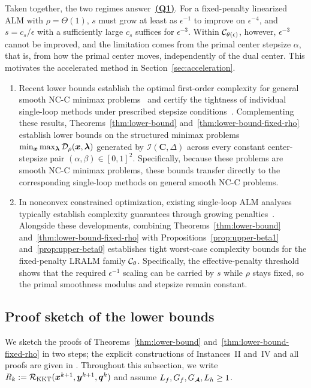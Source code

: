 Taken together, the two regimes answer~\hyperlink{Q1}{\textbf{(Q1)}}.
For a fixed-penalty linearized ALM with \(\rho=\Theta(1)\), \(s\) must grow at
least as \(\epsilon^{-1}\) to improve on \(\epsilon^{-4}\), and
\(s=c_s/\epsilon\) with a sufficiently large \(c_s\) suffices for
\(\epsilon^{-3}\). Within \(\mathcal{C}_{\theta(\epsilon)}\), however,
\(\epsilon^{-3}\) cannot be improved, and the limitation comes from the primal
center stepsize \(\alpha\), that is, from how the primal center moves,
independently of the dual center. This motivates 
the accelerated method in Section~\ref{sec:acceleration}.

\begin{remark} 
\begin{enumerate}[label=(\roman*)]
\item Recent lower bounds establish the optimal first-order complexity for
general smooth NC-C minimax problems~\cite{pan2026optimal,zhang2026matching}
and certify the tightness of individual single-loop methods under prescribed
stepsize
conditions~\cite[Theorem~3.4(i) and Corollary~3.1(i)]{li2026smoothing}.
Complementing these results, Theorems~\ref{thm:lower-bound}
and~\ref{thm:lower-bound-fixed-rho} establish lower bounds on the structured
minimax problems \(\min_{\bm{x}}\max_{\bm{\lambda}}\mathcal{D}_\rho(\bm{x},\bm{\lambda})\)
generated by \(\mathcal I(\mathbf C,\Delta)\) across every constant
center-stepsize pair \((\alpha,\beta)\in[0,1]^2\). Specifically, because
these problems are smooth NC-C minimax problems, these bounds transfer
directly to the corresponding single-loop methods on
general smooth NC-C problems.
\item In nonconvex constrained optimization, existing single-loop ALM analyses
typically establish complexity guarantees through growing
penalties~\cite{luSingleLoopGradientDescent2022,sun2024dual_descent_alm_admm,elbourkhissi2025perturbed}.
Alongside these developments, combining Theorems~\ref{thm:lower-bound}
and~\ref{thm:lower-bound-fixed-rho} with Propositions~\ref{prop:upper-beta1}
and~\ref{prop:upper-beta0} establishes tight worst-case complexity bounds for
the fixed-penalty LRALM family \(\mathcal{C}_\theta\). Specifically,
the effective-penalty threshold shows that the required \(\epsilon^{-1}\)
scaling can be carried by \(s\) while \(\rho\) stays fixed, so the primal
smoothness modulus and stepsize remain constant.
\end{enumerate}
\end{remark}

\subsection{Proof sketch of the lower bounds}
\label{sec:lb-proof}
We sketch the proofs of Theorems~\ref{thm:lower-bound}
and~\ref{thm:lower-bound-fixed-rho} in two steps; the explicit constructions of
Instances~II and~IV and all proofs are given in .
Throughout this subsection, we write
\(R_k:=\mathcal R_{\mathrm{KKT}}(\bm{x}^{k+1},\bm{y}^{k+1},\bm{q}^k)\) and assume
\(L_f,G_f,G_{\mathcal{A}},L_h\ge1\).

